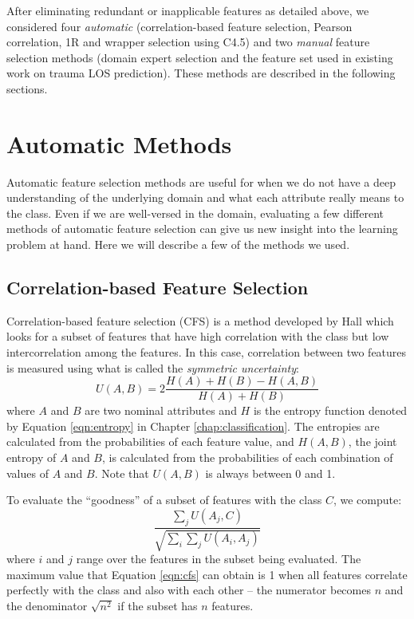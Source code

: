After eliminating redundant or inapplicable features as detailed above, we
considered four \textit{automatic} (correlation-based
feature selection, Pearson correlation, 1R and wrapper selection
using C4.5) and two \textit{manual} feature selection methods (domain expert
selection and the feature set used in existing work on trauma LOS prediction).
These methods are described in the following sections.

\section{Automatic Methods}
Automatic feature selection methods are useful for when we do not have a deep
understanding of the underlying domain and what each attribute really means to
the class. Even if we are well-versed in the domain, evaluating a few different
methods of automatic feature selection can give us new insight into the
learning problem at hand. Here we will describe a few of the methods we used.

\subsection{Correlation-based Feature Selection}
Correlation-based feature selection (CFS) is a method developed by Hall
\cite{Hall2000} which looks for a subset of features that have high correlation
with the class but low intercorrelation among the features. In this case,
correlation between two features is measured using what is called the
\textit{symmetric uncertainty}:
\begin{equation*}
U(A,B) = 2\dfrac{H(A)+H(B)-H(A,B)}{H(A)+H(B)}
\end{equation*}
where $A$ and $B$ are two nominal attributes and $H$ is the entropy function
denoted by Equation \ref{eqn:entropy} in Chapter \ref{chap:classification}.
The entropies are calculated from the probabilities of each feature value, and
$H(A,B)$, the joint entropy of $A$ and $B$, is calculated from the
probabilities of each combination of values of $A$ and $B$. Note that $U(A,B)$
is always between 0 and 1.

To evaluate the ``goodness'' of a subset of features with the class $C$, we
compute:
\begin{equation}
\label{eqn:cfs}
\dfrac{\sum_j U(A_j,C)}{\sqrt{\sum_i \sum_j U(A_i,A_j)}}
\end{equation}
where $i$ and $j$ range over the features in the subset being evaluated. The
maximum value that Equation \ref{eqn:cfs} can obtain is 1 when all features
correlate perfectly with the class and also with each other -- the numerator
becomes $n$ and the denominator $\sqrt{n^2}$ if the subset has $n$ features.

